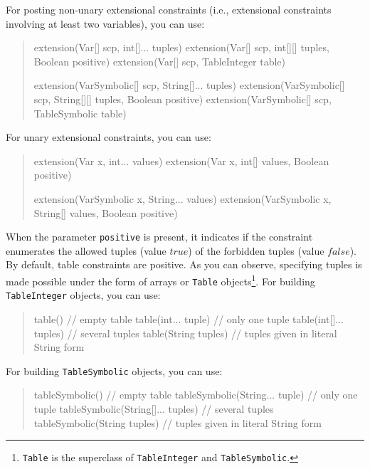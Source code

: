 \documentclass[10pt]{article}
\newcommand{\nn}[1]{{\tt #1}} %
\newenvironment{myvb}{\endgraf\small\verbatim}{\endverbatim}
\begin{document}
For posting non-unary extensional constraints (i.e., extensional constraints involving at least two variables), you can use:

\begin{quote}
\begin{myvb}
extension(Var[] scp, int[]... tuples)
extension(Var[] scp, int[][] tuples, Boolean positive) 
extension(Var[] scp, TableInteger table) 

extension(VarSymbolic[] scp, String[]... tuples)
extension(VarSymbolic[] scp, String[][] tuples, Boolean positive) 
extension(VarSymbolic[] scp, TableSymbolic table) 
\end{myvb}
\end{quote}

For unary extensional constraints, you can use:

\begin{quote}
\begin{myvb}
extension(Var x, int... values)
extension(Var x, int[] values, Boolean positive) 

extension(VarSymbolic x, String... values)
extension(VarSymbolic x, String[] values, Boolean positive) 
\end{myvb}
\end{quote}
When the parameter \nn{positive} is present, it indicates if the constraint enumerates the allowed tuples (value $true$) of the forbidden tuples (value $false$).
By default, table constraints are positive.
As you can observe, specifying tuples is made possible under the form of arrays or \nn{Table} objects\footnote{\nn{Table} is the superclass of \nn{TableInteger} and \nn{TableSymbolic}.}.
For building \nn{TableInteger} objects, you can use: 

\begin{quote}
\begin{myvb}
table()                           // empty table
table(int... tuple)               // only one tuple
table(int[]... tuples)            // several tuples
table(String tuples)              // tuples given in literal String form
\end{myvb}
\end{quote}

For building \nn{TableSymbolic} objects, you can use: 

\begin{quote}
\begin{myvb}
tableSymbolic()                   // empty table
tableSymbolic(String... tuple)    // only one tuple
tableSymbolic(String[]... tuples) // several tuples 
tableSymbolic(String tuples)      // tuples given in literal String form
\end{myvb}
\end{quote}
\end{document}
